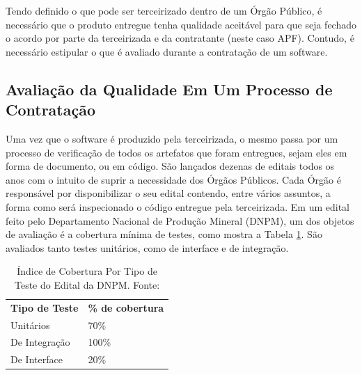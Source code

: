 Tendo definido o que pode ser terceirizado dentro de um Órgão Público, é necessário que o produto entregue tenha qualidade aceitável para que seja fechado o acordo por parte da terceirizada e da contratante (neste caso APF). Contudo, é necessário estipular o que é avaliado durante a contratação de um software.

\subsection{Avaliação da Qualidade Em Um Processo de Contratação }
Uma vez que o software é produzido pela terceirizada, o mesmo passa por um processo de verificação de todos os artefatos que foram entregues, sejam eles em forma de documento, ou em código. São lançados dezenas de editais todos os anos com o intuito de suprir a necessidade dos Órgãos Públicos. Cada Órgão é responsável por disponibilizar o seu edital contendo, entre vários assuntos, a forma como será inspecionado o código entregue pela terceirizada. Em um edital feito pelo Departamento Nacional de Produção Mineral (DNPM)\cite{edital}, um dos objetos de avaliação é a cobertura mínima de testes, como mostra a Tabela \ref{tabela1}. São avaliados tanto testes unitários, como de interface e de integração.

\begin{table}[h!]
\centering
\caption{Índice de Cobertura Por Tipo de Teste do Edital da DNPM. Fonte:\cite{edital}}
\label{tabela1}
\begin{tabular}{ll}
\textbf{Tipo de Teste} & \textbf{\% de cobertura} \\
Unitários              & 70\%                     \\
De Integração          & 100\%                    \\
De Interface           & 20\%                    
\end{tabular}
\end{table}



